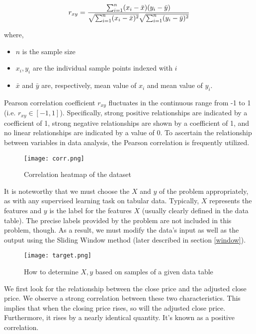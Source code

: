 \documentclass[a4paper]{article}
\begin{document}
$$
r_{xy} = \frac{\sum_{i=1}^{n}(x_{i}-\Bar{x})(y_{i}-\Bar{y})}{\sqrt{\sum_{i=1}^{n}(x_{i}-\Bar{x})^2}\sqrt{\sum_{i=1}^{n}(y_{i}-\Bar{y})^2}}
$$

where,

\begin{itemize}[leftmargin=7.5pt]
    \item $n$ is the sample size
    \item $x_{i}, y_{i}$ are the individual sample points indexed with $i$
    \item $\bar{x}$ and $\bar{y}$ are, respectively, mean value of $x_i$ and mean value of $y_i$.
\end{itemize}

Pearson correlation coefficient $r_{xy}$ fluctuates in the continuous range from -1 to 1 (i.e. $r_{xy} \in [-1,1]$). Specifically, strong positive relationships are indicated by a coefficient of 1, strong negative relationships are shown by a coefficient of 1, and no linear relationships are indicated by a value of 0. To ascertain the relationship between variables in data analysis, the Pearson correlation is frequently utilized.

    
\begin{figure}[!h]
    \centering
    \texttt{[image: corr.png]}
    \caption{Correlation heatmap of the dataset}
    \label{fig:corr}
\end{figure}

It is noteworthy that we must choose the $X$ and $y$ of the problem appropriately, as with any supervised learning task on tabular data. Typically, $X$ represents the features and $y$ is the label for the features $X$ (usually clearly defined in the data table). The precise labels provided by the problem are not included in this problem, though. As a result, we must modify the data's input as well as the output using the Sliding Window method (later described in section \ref{window}).

\begin{figure}
    \centering
    \texttt{[image: target.png]}
    \caption{How to determine $X, y$ based on samples of a given data table}
    \label{fig:xy}
\end{figure}

We first look for the relationship between the close price and the adjusted close price. We observe a strong correlation between these two characteristics. This implies that when the closing price rises, so will the adjusted close price. Furthermore, it rises by a nearly identical quantity. It's known as a positive correlation.
\end{document}
